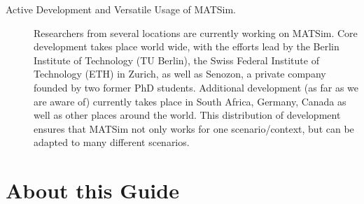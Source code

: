 \begin{description}
\item[Active Development and Versatile Usage of MATSim.]
Researchers from several locations are currently working on MATSim. Core
development takes place world wide, with the efforts lead by the Berlin
Institute of Technology (TU Berlin), the Swiss Federal Institute of Technology
(ETH) in Zurich, as well as Senozon, a private company founded by two former PhD students.
Additional development (as far as we are aware of) currently takes place in
South Africa, Germany, Canada as well as other places around the world. This
distribution of development ensures that MATSim not only works for one
scenario/context, but can be adapted to many different scenarios.
\end{description}

\section{About this Guide}

